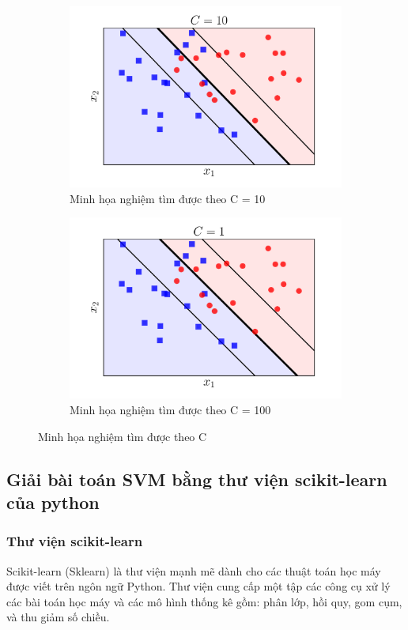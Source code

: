 \documentclass[a4paper, 12pt, oneside]{report}
\begin{document}
\begin{figure}[H]
\begin{subfigure}[H]{0.3\textwidth}
         \centering
         \includegraphics[width=\textwidth]{ssvm5_10.png}
         \caption{Minh họa nghiệm tìm được theo C = 10}
         \label{refhinh1}
     \end{subfigure}
     \hfill
     \begin{subfigure}[H]{0.3\textwidth}
         \centering
         \includegraphics[width=\textwidth]{ssvm5_1.png}
         \caption{Minh họa nghiệm tìm được theo C = 100}
         \label{refhinh1}
     \end{subfigure}
     \hfill
        \caption{Minh họa nghiệm tìm được theo C}
        \label{fig:three graphs}
\end{figure}
\subsection{Giải bài toán SVM bằng thư viện scikit-learn của python} 
\subsubsection{Thư viện scikit-learn}
Scikit-learn (Sklearn) là thư viện mạnh mẽ dành cho các thuật toán học máy được viết trên ngôn ngữ Python. Thư viện cung cấp một tập các công cụ xử lý các bài toán học máy và các mô hình thống kê gồm: phân lớp, hồi quy, gom cụm, và thu giảm số chiều.
\end{document}
